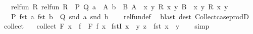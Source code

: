 \begin{isabellebody}
\ \ \ {\isachardoublequoteopen}{\isasymlbrakk}rel{\isacharunderscore}{\kern0pt}fun\ R{}\ {\isacharparenleft}{\kern0pt}rel{\isacharunderscore}{\kern0pt}fun\ R{}\ {\isacharparenleft}{\kern0pt}{\isacharequal}{\kern0pt}{\isacharparenright}{\kern0pt}{\isacharparenright}{\kern0pt}\ P\ Q{\isacharsemicolon}{\kern0pt}\ a\ {\isasymin}\ A{\isacharsemicolon}{\kern0pt}\ b\ {\isasymin}\ B{\isacharsemicolon}{\kern0pt}\ A\ {\isasymsubseteq}\ {\isacharbraceleft}{\kern0pt}{\isacharparenleft}{\kern0pt}x{\isacharcomma}{\kern0pt}\ y{\isacharparenright}{\kern0pt}{\isachardot}{\kern0pt}\ R{}\ x\ y{\isacharbraceright}{\kern0pt}{\isacharsemicolon}{\kern0pt}\ B\ {\isasymsubseteq}\ {\isacharbraceleft}{\kern0pt}{\isacharparenleft}{\kern0pt}x{\isacharcomma}{\kern0pt}\ y{\isacharparenright}{\kern0pt}{\isachardot}{\kern0pt}\ R{}\ x\ y{\isacharbraceright}{\kern0pt}{\isasymrbrakk}\ {\isasymLongrightarrow}\isanewline
\ \ \ P\ {\isacharparenleft}{\kern0pt}fst\ a{\isacharparenright}{\kern0pt}\ {\isacharparenleft}{\kern0pt}fst\ b{\isacharparenright}{\kern0pt}\ {\isasymlongleftrightarrow}\ Q\ {\isacharparenleft}{\kern0pt}snd\ a{\isacharparenright}{\kern0pt}\ {\isacharparenleft}{\kern0pt}snd\ b{\isacharparenright}{\kern0pt}{\isachardoublequoteclose}\isanewline
%
\isadelimproof
\ \ %
\endisadelimproof
%
\isatagproof
{}\isamarkupfalse%
\ rel{\isacharunderscore}{\kern0pt}fun{\isacharunderscore}{\kern0pt}def\ \isamarkupfalse%
\ {\isacharparenleft}{\kern0pt}blast\ dest{\isacharbang}{\kern0pt}{\isacharcolon}{\kern0pt}\ Collect{\isacharunderscore}{\kern0pt}case{\isacharunderscore}{\kern0pt}prodD{\isacharparenright}{\kern0pt}%
\endisatagproof
{\isafoldproof}%
%
\isadelimproof
\isanewline
%
\endisadelimproof
\isanewline
{}\isamarkupfalse%
\ collect\ \isanewline
\ \ {\isachardoublequoteopen}collect\ F\ x\ {\isacharequal}{\kern0pt}\ {\isacharparenleft}{\kern0pt}{\isasymUnion}f\ {\isasymin}\ F{\isachardot}{\kern0pt}\ f\ x{\isacharparenright}{\kern0pt}{\isachardoublequoteclose}\isanewline
\isanewline
{}\isamarkupfalse%
\ fstI{\isacharcolon}{\kern0pt}\ {\isachardoublequoteopen}x\ {\isacharequal}{\kern0pt}\ {\isacharparenleft}{\kern0pt}y{\isacharcomma}{\kern0pt}\ z{\isacharparenright}{\kern0pt}\ {\isasymLongrightarrow}\ fst\ x\ {\isacharequal}{\kern0pt}\ y{\isachardoublequoteclose}\isanewline
%
\isadelimproof
\ \ %
\endisadelimproof
%
\isatagproof
{}\isamarkupfalse%
\ simp%
\endisatagproof
{\isafoldproof}%
%
\isadelimproof
\isanewline
%
\endisadelimproof
\isanewline

\end{isabellebody}
